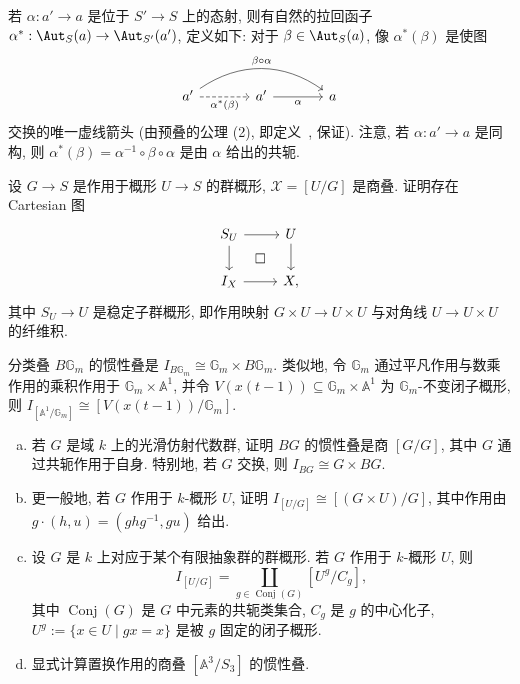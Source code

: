 若 $\alpha:a'\to a$ 是位于 $S'\to S$ 上的态射, 则有自然的拉回函子 $\alpha^*:\Aut_S(a)\to\Aut_{S'}(a')$, 定义如下: 对于 $\beta\in\Aut_S(a)$, 像 $\alpha^*(\beta)$ 是使图
\begin{equation}\label{src:4.2.11}
\begin{tikzcd}[column sep=large]
a'\arrow[r,dashed,"\alpha^*(\beta)"']\arrow[rr,bend left=35,"\beta\circ\alpha"]&a'\arrow[r,"\alpha"']&a
\end{tikzcd}
\end{equation}
交换的唯一虚线箭头 (由预叠的公理 (2), 即定义~, 保证). 注意, 若 $\alpha:a'\to a$ 是同构, 则 $\alpha^*(\beta)=\alpha^{-1}\circ\beta\circ\alpha$ 是由 $\alpha$ 给出的共轭.
\begin{exercise}\label{src:4.2.12}
设 $G\to S$ 是作用于概形 $U\to S$ 的群概形, $\mathcal X=[U/G]$ 是商叠. 证明存在 Cartesian 图
\[
\begin{tikzcd}
S_U\arrow[r]\arrow[d]\arrow[dr,phantom,"\square"]&U\arrow[d]\\
I_{\mathcal X}\arrow[r]&\mathcal X,
\end{tikzcd}
\]
其中 $S_U\to U$ 是稳定子群概形, 即作用映射 $G\times U\to U\times U$ 与对角线 $U\to U\times U$ 的纤维积.
\end{exercise}
\begin{example}\label{src:4.2.13}
分类叠 $B\mathbb G_m$ 的惯性叠是 $I_{B\mathbb G_m}\cong\mathbb G_m\times B\mathbb G_m$. 类似地, 令 $\mathbb G_m$ 通过平凡作用与数乘作用的乘积作用于 $\mathbb G_m\times\mathbb A^1$, 并令 $V(x(t-1))\subseteq\mathbb G_m\times\mathbb A^1$ 为 $\mathbb G_m$-不变闭子概形, 则 $I_{[\mathbb A^1/\mathbb G_m]}\cong[V(x(t-1))/\mathbb G_m]$.
\end{example}
\begin{exercise}\label{src:4.2.14}
\begin{enumerate}[(a)]
\item 若 $G$ 是域 $k$ 上的光滑仿射代数群, 证明 $BG$ 的惯性叠是商 $[G/G]$, 其中 $G$ 通过共轭作用于自身. 特别地, 若 $G$ 交换, 则 $I_{BG}\cong G\times BG$.
\item 更一般地, 若 $G$ 作用于 $k$-概形 $U$, 证明 $I_{[U/G]}\cong[(G\times U)/G]$, 其中作用由 $g\cdot(h,u)=(ghg^{-1},gu)$ 给出.
\item 设 $G$ 是 $k$ 上对应于某个有限抽象群的群概形. 若 $G$ 作用于 $k$-概形 $U$, 则
\[
I_{[U/G]}=\coprod_{g\in\operatorname{Conj}(G)}[U^g/C_g],
\]
其中 $\operatorname{Conj}(G)$ 是 $G$ 中元素的共轭类集合, $C_g$ 是 $g$ 的中心化子, $U^g:=\{x\in U\mid gx=x\}$ 是被 $g$ 固定的闭子概形.
\item 显式计算置换作用的商叠 $[\mathbb A^3/S_3]$ 的惯性叠.
\end{enumerate}
\end{exercise}
